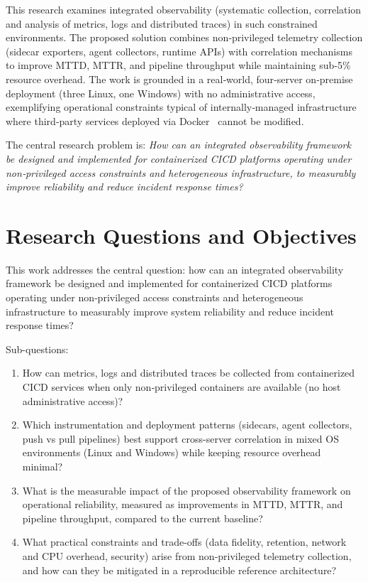 \documentclass[12pt]{article}
\begin{document}
This research examines integrated observability (systematic collection, correlation and analysis of metrics, logs and distributed traces) in such constrained environments. The proposed solution combines non‑privileged telemetry collection (sidecar exporters, agent collectors, runtime APIs) with correlation mechanisms to improve \ac{MTTD}, \ac{MTTR}, and pipeline throughput while maintaining sub-5\% resource overhead. The work is grounded in a real‑world, four‑server on‑premise deployment (three Linux, one Windows) with no administrative access, exemplifying operational constraints typical of internally‑managed infrastructure where third‑party services deployed via Docker~\cite{docker2014} cannot be modified.

The central research problem is: \textit{How can an integrated observability framework be designed and implemented for containerized \ac{CICD} platforms operating under non‑privileged access constraints and heterogeneous infrastructure, to measurably improve reliability and reduce incident response times?}

\section{Research Questions and Objectives}
This work addresses the central question: how can an integrated observability framework be designed and implemented for containerized \ac{CICD} platforms operating under non‑privileged access constraints and heterogeneous infrastructure to measurably improve system reliability and reduce incident response times?

Sub-questions:
\begin{enumerate}
    \item How can metrics, logs and distributed traces be collected from containerized \ac{CICD} services when only non‑privileged containers are available (no host administrative access)?
    \item Which instrumentation and deployment patterns (sidecars, agent collectors, push vs pull pipelines) best support cross-server correlation in mixed OS environments (Linux and Windows) while keeping resource overhead minimal?
    \item What is the measurable impact of the proposed observability framework on operational reliability, measured as improvements in \ac{MTTD}, \ac{MTTR}, and pipeline throughput, compared to the current baseline?
    \item What practical constraints and trade-offs (data fidelity, retention, network and CPU overhead, security) arise from non‑privileged telemetry collection, and how can they be mitigated in a reproducible reference architecture?
\end{enumerate}
\end{document}
